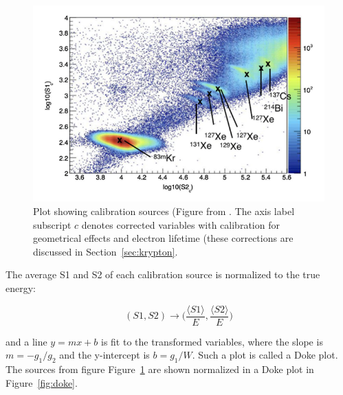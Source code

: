\begin{figure}[htbp]
\begin{center}
\includegraphics[width=\textwidth]{figures/lux/calibration_sources.png}
\caption{Plot showing calibration sources (Figure from \cite{LUX:Run03Comprehensive}. The axis label subscript $c$ denotes corrected variables with calibration for geometrical effects and electron lifetime (these corrections are discussed in Section~\ref{sec:krypton}.}
\label{fig:calib_sources}
\end{center}
\end{figure}

The average S1 and S2 of each calibration source is normalized to the true energy:

\begin{equation}
(S1, S2) \longrightarrow \Big(\frac{\langle S1 \rangle}{E}, \frac{\langle S2 \rangle}{E}\Big)
\end{equation}

and a line $y = mx + b$ is fit to the transformed variables, where the slope is $m = -g_{1} / g_{2}$ and the y-intercept is $b = g_{1} / W$. Such a plot is called a Doke plot. The sources from figure Figure~\ref{fig:calib_sources} are shown normalized in a Doke plot in Figure~\ref{fig:doke}.

